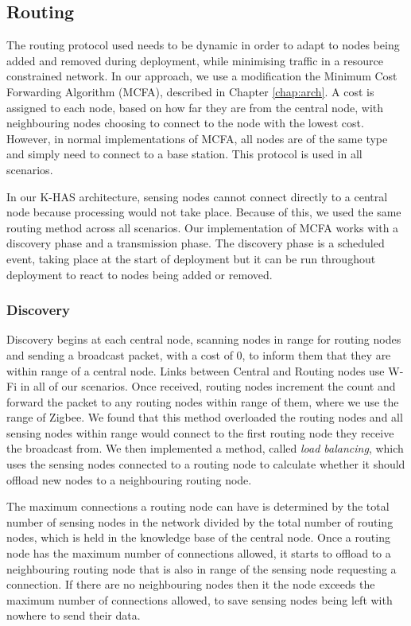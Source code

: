\subsection{Routing}
The routing protocol used needs to be dynamic in order to adapt to nodes being added and removed during deployment, while minimising traffic in a resource constrained network. In our approach, we use a modification the Minimum Cost Forwarding Algorithm (MCFA), described in Chapter \ref{chap:arch}. A cost is assigned to each node, based on how far they are from the central node, with neighbouring nodes choosing to connect to the node with the lowest cost. However, in normal implementations of MCFA, all nodes are of the same type and simply need to connect to a base station. This protocol is used in all scenarios.

In our K-HAS architecture, sensing nodes cannot connect directly to a central node because processing would not take place. Because of this, we used the same routing method across all scenarios. Our implementation of MCFA works with a discovery phase and a transmission phase. The discovery phase is a scheduled event, taking place at the start of deployment but it can be run throughout deployment to react to nodes being added or removed. 

\subsubsection{Discovery}
	Discovery begins at each central node, scanning nodes in range for routing nodes and sending a broadcast packet, with a cost of 0, to inform them that they are within range of a central node. Links between Central and Routing nodes use W-Fi in all of our scenarios. Once received, routing nodes increment the count and forward the packet to any routing nodes within range of them, where we use the range of Zigbee. We found that this method overloaded the routing nodes and all sensing nodes within range would connect to the first routing node they receive the broadcast from. We then implemented a method, called \textit{load balancing}, which uses the sensing nodes connected to a routing node to calculate whether it should offload new nodes to a neighbouring routing node.
	
	The maximum connections a routing node can have is determined by the total number of sensing nodes in the network divided by the total number of routing nodes, which is held in the knowledge base of the central node. Once a routing node has the maximum number of connections allowed, it starts to offload to a neighbouring routing node that is also in range of the sensing node requesting a connection. If there are no neighbouring nodes then it the node exceeds the maximum number of connections allowed, to save sensing nodes being left with nowhere to send their data.
	
